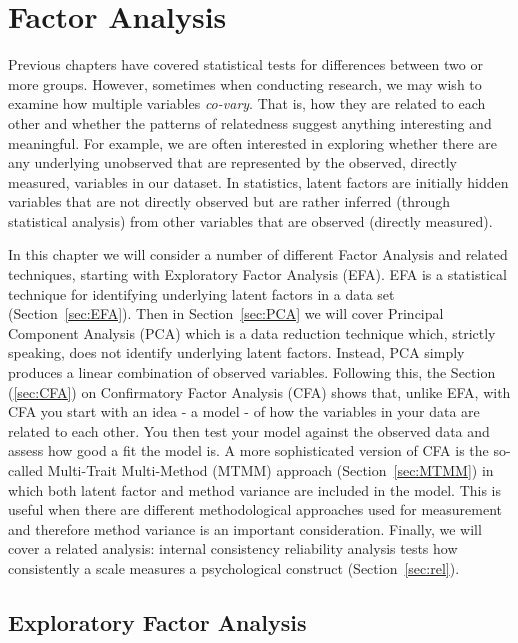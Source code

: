 
\chapter{Factor Analysis \label{ch:factoranalysis}}

Previous chapters have covered statistical tests for differences between two or more groups. However, sometimes when conducting research, we may wish to examine how multiple variables {\it co-vary}. That is, how they are related to each other and whether the patterns of relatedness suggest anything interesting and meaningful. For example, we are often interested in exploring whether there are any underlying unobserved  that are represented by the observed, directly measured, variables in our dataset. In statistics, latent factors are initially hidden variables that are not directly observed but are rather inferred (through statistical analysis) from other variables that are observed (directly measured).

In this chapter we will consider a number of different Factor Analysis and related techniques, starting with Exploratory Factor Analysis (EFA). EFA is a statistical technique for identifying underlying latent factors in a data set (Section~\ref{sec:EFA}). Then in Section~\ref{sec:PCA} we will cover Principal Component Analysis (PCA) which is a data reduction technique which, strictly speaking, does not identify underlying latent factors. Instead, PCA simply produces a linear combination of observed variables. Following this, the Section (\ref{sec:CFA}) on Confirmatory Factor Analysis (CFA) shows that, unlike EFA, with CFA you start with an idea - a model - of how the variables in your data are related to each other. You then test your model against the observed data and assess how good a fit the model is. A more sophisticated version of CFA is the so-called Multi-Trait Multi-Method (MTMM) approach (Section~\ref{sec:MTMM}) in which both latent factor and method variance are included in the model. This is useful when there are different methodological approaches used for measurement and therefore method variance is an important consideration. Finally, we will cover a related analysis: internal consistency reliability analysis tests how consistently a scale measures a psychological construct (Section~\ref{sec:rel}).


\section{Exploratory Factor Analysis~\label{sec:EFA}}

